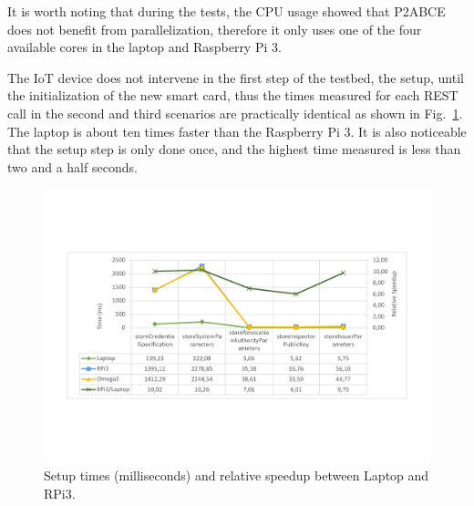 It is worth noting that during the tests, the CPU usage showed that P2ABCE does not benefit from parallelization, therefore it only uses one of the four available cores in the laptop and Raspberry Pi 3.

\hfil

The IoT device does not intervene in the first step of the testbed, the setup, until the initialization of the new smart card, thus the times measured for each REST call in the second and third scenarios are practically identical as shown in Fig.~\ref{fig:setup:graph}. The laptop is about ten times faster than the Raspberry Pi 3. It is also noticeable that the setup step is only done once, and the highest time measured is less than two and a half seconds.

\begin{figure}[bth]
	\centering
	\includegraphics[width=\linewidth]{gfx/SetupGraphTable}
	\caption{Setup times (milliseconds) and relative speedup between Laptop and RPi3.}
	\label{fig:setup:graph}
\end{figure}




\hfil

